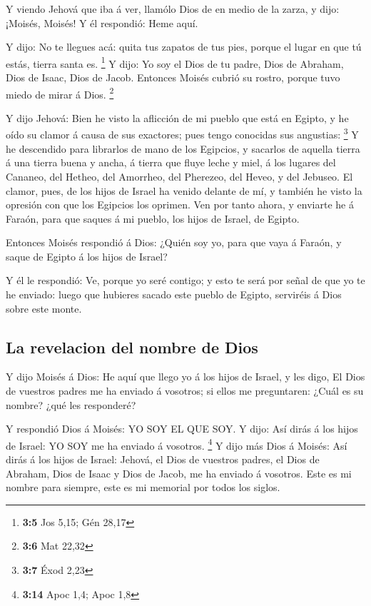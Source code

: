  Y viendo Jehová que iba á ver, llamólo Dios de en medio de
la zarza, y dijo: ¡Moisés, Moisés! Y él respondió: Heme aquí.

 Y dijo: No te llegues acá: quita tus zapatos de tus pies,
porque el lugar en que tú estás, tierra santa es. \footnote{\textbf{3:5}
  Jos 5,15; Gén 28,17}  Y dijo: Yo soy el Dios de tu padre,
Dios de Abraham, Dios de Isaac, Dios de Jacob. Entonces Moisés cubrió su
rostro, porque tuvo miedo de mirar á Dios. \footnote{\textbf{3:6} Mat
  22,32}

 Y dijo Jehová: Bien he visto la aflicción de mi pueblo que
está en Egipto, y he oído su clamor á causa de sus exactores; pues tengo
conocidas sus angustias: \footnote{\textbf{3:7} Éxod 2,23} 
Y he descendido para librarlos de mano de los Egipcios, y sacarlos de
aquella tierra á una tierra buena y ancha, á tierra que fluye leche y
miel, á los lugares del Cananeo, del Hetheo, del Amorrheo, del Pherezeo,
del Heveo, y del Jebuseo.  El clamor, pues, de los hijos de
Israel ha venido delante de mí, y también he visto la opresión con que
los Egipcios los oprimen.  Ven por tanto ahora, y enviarte
he á Faraón, para que saques á mi pueblo, los hijos de Israel, de
Egipto.

 Entonces Moisés respondió á Dios: ¿Quién soy yo, para que
vaya á Faraón, y saque de Egipto á los hijos de Israel?

 Y él le respondió: Ve, porque yo seré contigo; y esto te
será por señal de que yo te he enviado: luego que hubieres sacado este
pueblo de Egipto, serviréis á Dios sobre este monte.

\hypertarget{la-revelacion-del-nombre-de-dios}{%
\subsection{La revelacion del nombre de
Dios}\label{la-revelacion-del-nombre-de-dios}}

 Y dijo Moisés á Dios: He aquí que llego yo á los hijos de
Israel, y les digo, El Dios de vuestros padres me ha enviado á vosotros;
si ellos me preguntaren: ¿Cuál es su nombre? ¿qué les responderé?

 Y respondió Dios á Moisés: YO SOY EL QUE SOY. Y dijo: Así
dirás á los hijos de Israel: YO SOY me ha enviado á vosotros.
\footnote{\textbf{3:14} Apoc 1,4; Apoc 1,8}  Y dijo más
Dios á Moisés: Así dirás á los hijos de Israel: Jehová, el Dios de
vuestros padres, el Dios de Abraham, Dios de Isaac y Dios de Jacob, me
ha enviado á vosotros. Este es mi nombre para siempre, este es mi
memorial por todos los siglos.

